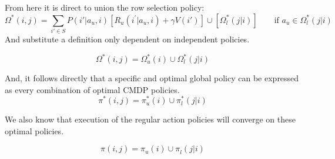 \documentclass[compsoc,journal,letterpaper,10pt,draftcls,twocolumn]{IEEEtran}
\begin{document}
From here it is direct to union the row selection policy:
\begin{equation}
\Omega^{*}\left( i,j \right) =   \sum_{i' \in S}
P\left( i'|a_{u}, i \right)\left\lbrack R_{u}\left( i^{'}|a_{u}, i \right) + \gamma V\left( i' \right) \right\rbrack \cup \left\lbrack \Omega_{l}^{*}\left( j|i \right) \right\rbrack
\qquad\textrm{if\ }a_{u} \in\Omega_{l}^{*}\left( j|i \right)
\end{equation}
And substitute a definition only dependent on independent policies.
 
\begin{equation}
\Omega^{*}\left( i,j \right) = \Omega_{u}^{*}\left( i \right) \cup \Omega_{l}^{*}\left( j|i \right)
\end{equation}
 
And, it follows directly that a specific and optimal global policy can
be expressed as every combination of optimal CMDP policies.
\begin{equation}
\pi^{*}\left( i,j \right) = \pi_{u}^{*}\left( i \right) \cup \pi_{l}^{*}\left( j|i \right)
\end{equation}

We also know that execution of the regular action policies will converge
on these optimal policies.

\begin{equation}
\pi\left( i,j \right) = \pi_{u}^{\ }\left( i \right) \cup \pi_{l}^{\ }\left( j|i \right)
\end{equation}
\end{document}
